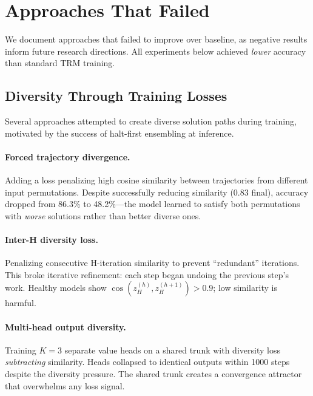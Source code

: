 \appendix

\section{Approaches That Failed}
\label{app:failed}

We document approaches that failed to improve over baseline, as negative results
inform future research directions. All experiments below achieved \emph{lower}
accuracy than standard TRM training.

\subsection{Diversity Through Training Losses}

Several approaches attempted to create diverse solution paths during training,
motivated by the success of halt-first ensembling at inference.

\paragraph{Forced trajectory divergence.} Adding a loss penalizing high cosine
similarity between trajectories from different input permutations. Despite
successfully reducing similarity (0.83 final), accuracy dropped from 86.3\% to
48.2\%---the model learned to satisfy both permutations with \emph{worse}
solutions rather than better diverse ones.

\paragraph{Inter-H diversity loss.} Penalizing consecutive H-iteration
similarity to prevent ``redundant'' iterations. This broke iterative
refinement: each step began undoing the previous step's work. Healthy models
show $\cos(z_H^{(h)}, z_H^{(h+1)}) > 0.9$; low similarity is harmful.

\paragraph{Multi-head output diversity.} Training $K{=}3$ separate value heads
on a shared trunk with diversity loss \emph{subtracting} similarity. Heads
collapsed to identical outputs within 1000 steps despite the diversity pressure.
The shared trunk creates a convergence attractor that overwhelms any loss signal.

